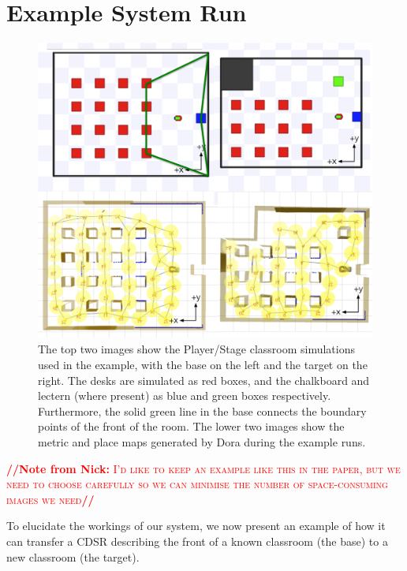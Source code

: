 \documentclass[letterpaper]{article}
\newcommand{\from}[2]{\textcolor{red}{\noindent\textbf{//}\textbf{Note
      from #1:}\textsc{ #2}\textbf{//}}}
\begin{document}
\section{Example System Run}\label{sec:example}

\begin{figure}[t]
  \includegraphics[width=\columnwidth]{images/classroom-maps-axes-annotation.png}
  \caption{The top two images show the Player/Stage classroom simulations used in the example, with the base on the left and the target on the right. The desks are simulated as red boxes, and the chalkboard and lectern (where present) as blue and green boxes respectively. Furthermore, the solid green line in the base connects the boundary points of the front of the room. The lower two images show the metric and place maps generated by Dora during the example runs.}
  \label{fig:dora-maps}
\end{figure}

\from{Nick}{I'd like to keep an example like this in the paper, but we need to choose carefully so we can minimise the number of space-consuming images we need}

To elucidate the workings of our system, we now present an example of how it can transfer a CDSR describing the front of a known classroom (the base) to a new classroom (the target). 
\end{document}
